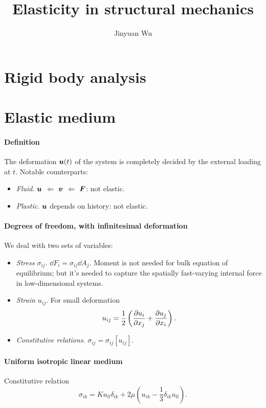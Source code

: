 \documentclass[hyperref, a4paper]{article}
\title{Elasticity in structural mechanics}
\author{Jinyuan Wu}
\begin{document}
\maketitle

\section{Rigid body analysis}

\section{Elastic medium}

\paragraph*{Definition} The deformation $\vb*{u}(t)$ of the system 
is completely decided by the external loading at $t$.
Notable counterparts:
\begin{itemize}
    \item \emph{Fluid}. $\vb*{u}$ $\Leftarrow$ $\vb*{v}$ $\Leftarrow$ $\vb*{F}$: not elastic.
    \item \emph{Plastic}. $\vb*{u}$ depends on history: not elastic.
\end{itemize}

\paragraph*{Degrees of freedom, with infinitesimal deformation} We deal with two sets of variables:
\begin{itemize}
    \item \emph{Stress $\sigma_{ij}$}. $\dd{F}_i = \sigma_{ij} \dd{A}_j$.
    Moment is not needed for bulk equation of equilibrium; 
    but it's needed to capture the spatially fast-varying internal force 
    in low-dimensional systems.
    \item \emph{Strain $u_{ij}$}. For small deformation
    \begin{equation}
        u_{ij} = \frac{1}{2} \left(
            \pdv{u_i}{x_j} + \pdv{u_j}{x_i}
        \right).
    \end{equation}
    \item \emph{Constitutive relations}. $\sigma_{ij} = \sigma_{ij}[u_{ij}]$.
\end{itemize}

\paragraph*{Uniform isotropic linear medium} Constitutive relation  
\begin{equation}
    \sigma_{ik} = K u_{ll} \delta_{ik}
    + 2 \mu \left(
        u_{ik} - \frac{1}{3} \delta_{ik} u_{ll}
    \right).
    \label{eq:constitutive-relation}
\end{equation}
\end{document}
